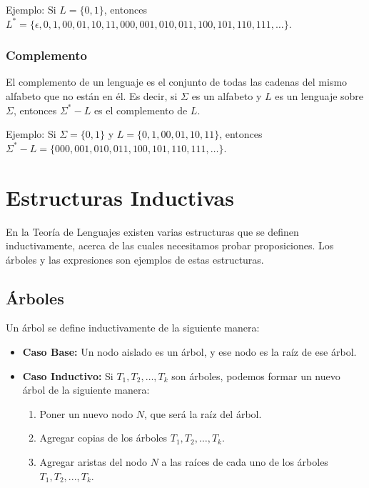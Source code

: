\documentclass[11pt]{article}
\begin{document}
    Ejemplo: Si $L = \{0, 1\}$, entonces $L^{\ast} = \{\epsilon, 0, 1, 00, 01, 10, 11, 000, 001, 010, 011, 100, 101, 110, 111, \ldots\}$.

    \bigskip %

    \subsubsection{Complemento}

    El complemento de un lenguaje es el conjunto de todas las cadenas del mismo alfabeto que no están en él. Es decir, si $\Sigma$ es un alfabeto y $L$ es un lenguaje sobre $\Sigma$, entonces $\Sigma^{\ast} - L$ es el complemento de $L$.

    Ejemplo: Si $\Sigma = \{0, 1\}$ y $L = \{0, 1, 00, 01, 10, 11\}$, entonces $\Sigma^{\ast} - L = \{000, 001, 010, 011, 100, 101, 110, 111, \ldots\}$.

    \bigskip %


    \section{Estructuras Inductivas}

    En la Teoría de Lenguajes existen varias estructuras que se definen inductivamente, acerca de las cuales necesitamos probar proposiciones. Los árboles y las expresiones son ejemplos de estas estructuras.

    \bigskip %

    \subsection{Árboles}

    Un árbol se define inductivamente de la siguiente manera:

    \begin{itemize}
        \item \textbf{Caso Base:} Un nodo aislado es un árbol, y ese nodo es la raíz de ese árbol.
        \item \textbf{Caso Inductivo:} Si $T_1, T_2, \dots, T_k$ son árboles, podemos formar un nuevo árbol de la siguiente manera:
        \begin{enumerate}
            \item Poner un nuevo nodo $N$, que será la raíz del árbol.
            \item Agregar copias de los árboles $T_1, T_2, \dots, T_k$.
            \item Agregar aristas del nodo $N$ a las raíces de cada uno de los árboles $T_1, T_2, ..., T_k$.
        \end{enumerate}
    \end{itemize}
\end{document}
